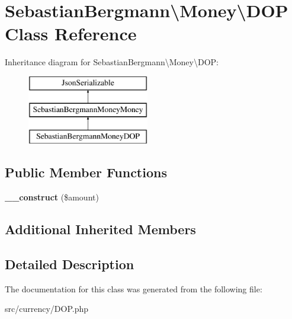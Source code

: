 \hypertarget{classSebastianBergmann_1_1Money_1_1DOP}{}\section{Sebastian\+Bergmann\textbackslash{}Money\textbackslash{}D\+O\+P Class Reference}
\label{classSebastianBergmann_1_1Money_1_1DOP}
Inheritance diagram for Sebastian\+Bergmann\textbackslash{}Money\textbackslash{}D\+O\+P\+:\begin{figure}[H]
\begin{center}
\leavevmode
\includegraphics[height=3.000000cm]{classSebastianBergmann_1_1Money_1_1DOP}
\end{center}
\end{figure}
\subsection*{Public Member Functions}
\begin{DoxyCompactItemize}
\item 
\hypertarget{classSebastianBergmann_1_1Money_1_1DOP_a08ced38f36b4cf2a1f6dd30765187a79}{}{\bfseries \+\_\+\+\_\+construct} (\$amount)\label{classSebastianBergmann_1_1Money_1_1DOP_a08ced38f36b4cf2a1f6dd30765187a79}

\end{DoxyCompactItemize}
\subsection*{Additional Inherited Members}


\subsection{Detailed Description}


The documentation for this class was generated from the following file\+:\begin{DoxyCompactItemize}
\item 
src/currency/D\+O\+P.\+php\end{DoxyCompactItemize}
